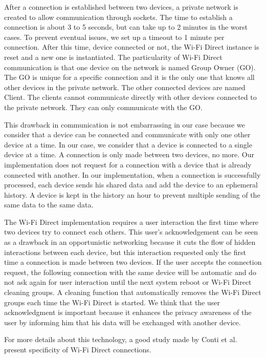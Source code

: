 After a connection is established between two devices, a private network is created to allow communication through sockets.
The time to establish a connection is about 3 to 5 seconds, but can take up to 2 minutes in the worst cases.
To prevent eventual issues, we set up a timeout to 1 minute per connection.
After this time, device connected or not, the Wi-Fi Direct instance is reset and a new one is instantiated.
The particularity of Wi-Fi Direct communication is that one device on the network is named Group Owner (GO).
The GO is unique for a specific connection and it is the only one that knows all other devices in the private network.
The other connected devices are named Client.
The clients cannot communicate directly with other devices connected to the private network.
They can only communicate with the GO.

This drawback in communication is not embarrassing in our case because we consider that a device can be connected and communicate with only one other device at a time.
In our case, we consider that a device is connected to a single device at a time.
A connection is only made between two devices, no more.
Our implementation does not request for a connection with a device that is already connected with another.
In our implementation, when a connection is successfully processed, each device sends his shared data and add the device to an ephemeral history.
A device is kept in the history an hour to prevent multiple sending of the same data to the same data.

The Wi-Fi Direct implementation requires a user interaction the first time where two devices try to connect each others.
This user's acknowledgement can be seen as a drawback in an opportunistic networking because it cuts the flow of hidden interactions between each device, but this interaction requested only the first time a connection is made between two devices.
If the user accepts the connection request, the following connection with the same device will be automatic and do not ask again for user interaction until the next system reboot or Wi-Fi Direct cleaning groups.
A cleaning function that automatically removes the Wi-Fi Direct groups each time the Wi-Fi Direct is started.
We think that the user acknowledgment is important because it enhances the privacy awareness of the user by informing him that his data will be exchanged with another device.

For more details about this technology, a good study made by Conti et al.~\cite{DBLP:conf/wd/ContiDMP13} present specificity of Wi-Fi Direct connections.


